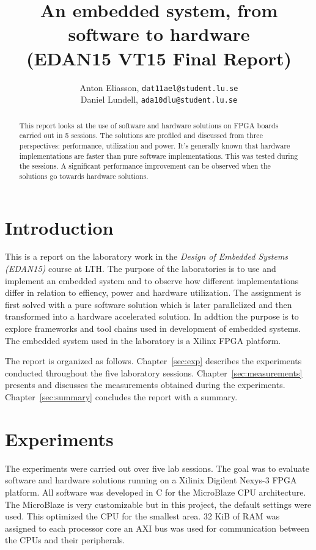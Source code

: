 \documentclass[11pt]{article}
\title{An embedded system, from software to hardware\\\small{(EDAN15 VT15 Final Report)}}
\author{
Anton Eliasson, \texttt{dat11ael@student.lu.se}\\
Daniel Lundell, \texttt{ada10dlu@student.lu.se}
}
\begin{document}
\lstset{
	language=C,
	captionpos=b,
	basicstyle=\footnotesize\ttfamily
}

\maketitle

\begin{abstract}
This report looks at the use of software and hardware solutions on FPGA boards carried out in 5 sessions. The solutions are profiled and discussed from three perspectives: performance, utilization and power. It's generally known that hardware implementations are faster than pure software implementations. This was tested during the sessions. A significant performance improvement can be observed when the solutions go towards hardware solutions.

\end{abstract}

\section{Introduction}
This is a report on the laboratory work in the \emph{Design of Embedded Systems (EDAN15)} course at LTH. The purpose of the laboratories is to use and implement an embedded system and to observe how different implementations differ in relation to effiency, power and hardware utilization. The assignment is first solved with a pure software solution which is later parallelized and then transformed into a hardware accelerated solution. In addtion the purpose is to explore frameworks and tool chains used in development of embedded systems. The embedded system used in the laboratory is a Xilinx FPGA platform.

The report is organized as follows. Chapter~\ref{sec:exp} describes the experiments conducted throughout the five laboratory sessions. Chapter~\ref{sec:measurements} presents and discusses the measurements obtained during the experiments. Chapter~\ref{sec:summary} concludes the report with a summary.

\section{Experiments\label{sec:exp}}
The experiments were carried out over five lab sessions. The goal was to evaluate software and hardware solutions running on a Xilinix Digilent Nexys-3 FPGA platform. All software was developed in C for the MicroBlaze\cite{microblaze} CPU architecture. The MicroBlaze is very customizable but in this project, the default settings were used. This optimized the CPU for the smallest area. 32 KiB of RAM was assigned to each processor core an AXI bus was used for communication between the CPUs and their peripherals.
\end{document}
